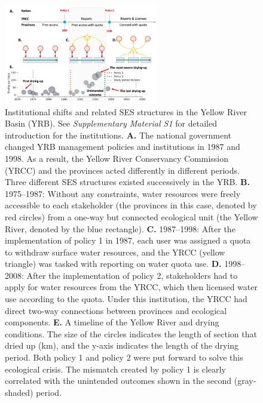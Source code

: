 \documentclass{nsr}
\begin{document}
\begin{figure}[!ht]
    \centering
    \includegraphics[width=16pc]{../../../figs/diagrams/structure.jpg}
	\caption{
		Institutional shifts and related SES structures in the Yellow River Basin (YRB). See \textit{Supplementary Material S1} for detailed introduction for the institutions.
		\textbf{A.} The national government changed YRB management policies and institutions in 1987 and 1998. As a result, the Yellow River Conservancy Commission (YRCC) and the provinces acted differently in different periods. Three different SES structures existed successively in the YRB.
		\textbf{B.} 1975–1987: Without any constraints, water resources were freely accessible to each stakeholder (the provinces in this case, denoted by red circles) from a one-way but connected ecological unit (the Yellow River, denoted by the blue rectangle).
		\textbf{C.} 1987–1998: After the implementation of policy 1 in 1987, each user was assigned a quota to withdraw surface water resources, and the YRCC (yellow triangle) was tasked with reporting on water quota use.
		\textbf{D.} 1998–2008: After the implementation of policy 2, stakeholders had to apply for water resources from the YRCC, which then licensed water use according to the quota. Under this institution, the YRCC had direct two-way connections between provinces and ecological components.
		\textbf{E.} A timeline of the Yellow River and drying conditions. The size of the circles indicates the length of section that dried up (km), and the y-axis indicates the length of the drying period. Both policy 1 and policy 2 were put forward to solve this ecological crisis. The mismatch created by policy 1 is clearly correlated with the unintended outcomes shown in the second (gray-shaded) period.
	}
	\label{fig:structure}
\end{figure}
\end{document}
